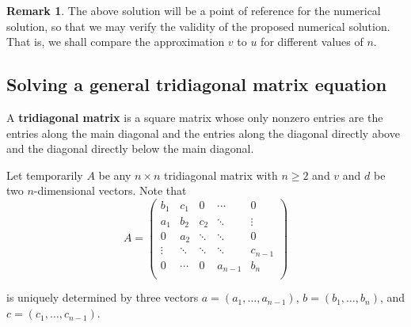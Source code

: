\documentclass[a4paper,10pt]{scrartcl}\sloppy
\theoremstyle{definition}
\newtheorem{rem}[thm]{Remark}
\begin{document}
\begin{rem} The above solution will be a point of reference for the numerical solution, so that we may verify the validity of the proposed numerical solution. That is, we shall compare the approximation $v$ to $u$ for different values of $n$.
 
\end{rem}

\subsection{Solving a general tridiagonal matrix equation}\label{generaltridiagmateq}

A \textbf{tridiagonal matrix} is a square matrix whose only nonzero entries are the entries along the main diagonal and the entries along the diagonal directly above and the diagonal directly below the main diagonal. 

Let temporarily $A$ be any $n\times n$ tridiagonal matrix with $n\geq 2$ and $v$ and $d$ be two $n$-dimensional vectors. Note that
$$A=\begin{pmatrix}
   b_1 & c_1 & 0 &  \cdots  &0  \\
   a_1 & b_2 & c_2   &\ddots  & \vdots \\
   0 & a_2 & \ddots   & \ddots   &0 \\
   \vdots   & \ddots &\ddots & \ddots &c_{n-1} \\
   0 & \cdots  &0  & a_{n-1}  &b_n \\
\end{pmatrix}
$$

\noindent is uniquely determined by three vectors $a=(a_1,\ldots,a_{n-1})$, $b=(b_1,\ldots,b_n)$, and $c=(c_1,\ldots,c_{n-1})$.
\end{document}
